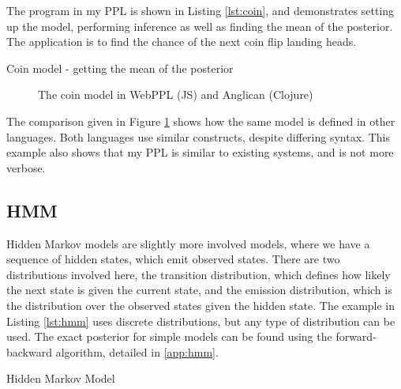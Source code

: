 \documentclass[sigconf]{acmart}
\begin{document}
The program in my PPL is shown in Listing \ref{lst:coin}, and demonstrates setting up the model, performing inference as well as finding the mean of the posterior. The application is to find the chance of the next coin flip landing heads.

\begin{listing}[!ht]
  \caption{Coin model - getting the mean of the posterior}
  \label{lst:coin}
\end{listing}


\begin{figure}[!htb]
  \begin{minipage}{0.5\textwidth}
    \centering
  \end{minipage}
  \begin{minipage}{0.5\textwidth}
    \centering
  \end{minipage}
  \caption{The coin model in WebPPL (JS) and Anglican (Clojure)}
  \label{fig:compare-coin}
\end{figure}

The comparison given in Figure \ref{fig:compare-coin} shows how the same model is defined in other languages. Both languages use similar constructs, despite differing syntax. This example also shows that my PPL is similar to existing systems, and is not more verbose.

\subsection{HMM}
Hidden Markov models are slightly more involved models, where we have a sequence of hidden states, which emit observed states. There are two distributions involved here, the transition distribution, which defines how likely the next state is given the current state, and the emission distribution, which is the distribution over the observed states given the hidden state. The example in Listing \ref{lst:hmm} uses discrete distributions, but any type of distribution can be used. The exact posterior for simple models can be found using the forward-backward algorithm, detailed in \ref{app:hmm}.
\begin{listing}[!ht]
  \caption{Hidden Markov Model}
  \label{lst:hmm}
\end{listing}
\end{document}
